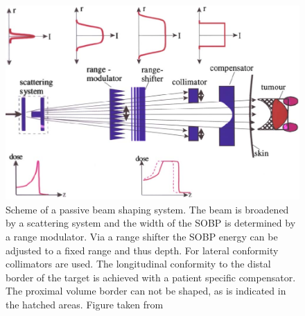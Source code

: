 \vspace*{0.8cm}
\begin{figure}[H]
\begin{center}
\includegraphics[scale=0.4]{./teile/introduction/deliverypassive.png}
\caption{Scheme of a passive beam shaping system. The beam is broadened by a scattering system and the width of the SOBP is determined by a 
range modulator. Via a range shifter the SOBP energy can be adjusted to a fixed range and thus depth. For lateral conformity collimators are 
used. The longitudinal conformity to the distal border of the target is achieved with a patient specific compensator. The proximal volume 
border can not be shaped, as is indicated in the hatched areas. Figure taken from \cite{Sch10}}
\label{passive}
\end{center}
\end{figure}

\newpage

